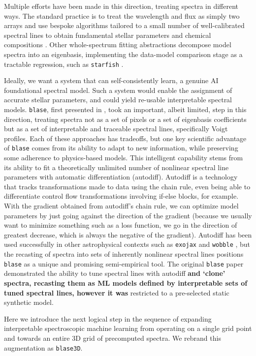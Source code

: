 \documentclass[twocolumn, linenumbers]{aastex631}
\begin{document}
Multiple efforts have been made in this direction, treating spectra in different ways.
The standard practice is to treat the wavelength and flux as simply two arrays and use bespoke algorithms tailored to a small number of well-calibrated spectral lines to obtain fundamental stellar parameters and chemical compositions \citep{pipeline1, pipeline2}.
Other whole-spectrum fitting abstractions decompose model spectra into an eigenbasis, implementing the data-model comparison stage as a tractable regression, such as \texttt{starfish} \citep{starfish}.

Ideally, we want a system that can self-consistently learn, a genuine AI foundational spectral model.
Such a system would enable the assignment of accurate stellar parameters, and could yield re-usable interpretable spectral models.
\texttt{blase}, first presented in \citealt{blase}, took an important, albeit limited, step in this direction, treating spectra not as a set of pixels or a set of eigenbasis coefficients but as a set of interpretable and traceable spectral lines, specifically Voigt profiles.
Each of these approaches has tradeoffs, but one key scientific advantage of \texttt{blase} comes from its ability to adapt to new information, while preserving some adherence to physics-based models.
This intelligent capability stems from its ability to fit a theoretically unlimited number of nonlinear spectral line parameters with automatic differentiation (autodiff).
Autodiff is a technology that tracks transformations made to data using the chain rule, even being able to differentiate control flow transformations involving if-else blocks, for example.
With the gradient obtained from autodiff's chain rule, we can optimize model parameters by just going against the direction of the gradient (because we usually want to minimize something such as a loss function, we go in the direction of greatest decrease, which is always the negative of the gradient).
Autodiff has been used successfully in other astrophysical contexts such as \texttt{exojax} \textbf{\citep{exojax}} and \texttt{wobble} \citep{wobble}, but the recasting of spectra into sets of inherently nonlinear spectral lines positions \texttt{blase} as a unique and promising semi-empirical tool.
The original \texttt{blase} paper demonstrated the ability to tune spectral lines with autodiff \textbf{and `clone' spectra, recasting them as ML models defined by interpretable sets of tuned spectral lines, however it was} restricted to a pre-selected static synthetic model.

Here we introduce the next logical step in the sequence of expanding interpretable spectroscopic machine learning from operating on a single grid point and towards an entire 3D grid of precomputed spectra.
We rebrand this augmentation as \texttt{blase3D}.
\end{document}
